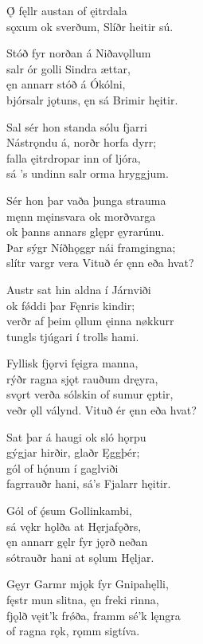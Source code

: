 \bva Ǫ́ fęllr austan \hld of ęitrdala \\
sǫxum ok sverðum, \hld Slíðr heitir sú.

\bva Stóð fyr norðan \hld á Niðavǫllum \\
salr ór golli \hld Sindra ættar, \\
ęn annarr stóð \hld á Ókólni, \\
bjórsalr jǫtuns, \hld ęn sá Brimir hęitir.

\bva Sal sér hon standa \hld sólu fjarri \\
Nástrǫndu á, \hld norðr horfa dyrr; \\
falla ęitrdropar \hld inn of ljóra, \\
sá ’s undinn salr \hld orma hryggjum.

\bva Sér hon þar vaða \hld þunga strauma \\
męnn męinsvara \hld ok morðvarga \\
ok þanns annars glępr \hld ęyrarúnu. \\
Þar sýgr Níðhǫggr \hld nái framgingna; \\
slítr vargr vera \hld Vituð ér ęnn eða hvat?

\bva Austr sat hin aldna \hld í Járnviði \\
ok fǿddi þar \hld Fęnris kindir; \\
verðr af þeim ǫllum \hld ęinna nøkkurr \\
tungls tjúgari \hld í trolls hami.

\bva Fyllisk fjǫrvi \hld fęigra manna, \\
rýðr ragna sjǫt \hld rauðum dręyra, \\
svǫrt verða sólskin \hld of sumur ęptir, \\
veðr ǫll válynd. \hld Vituð ér ęnn eða hvat?

\bva Sat þar á haugi \hld ok sló hǫrpu \\
gýgjar hirðir, \hld glaðr Ęggþér; \\
gól of hǫ́num \hld í gaglviði \\
fagrrauðr hani, \hld sá's Fjalarr hęitir.

\bva Gól of ǫ́sum \hld Gollinkambi, \\
sá vękr hǫlða \hld at Hęrjafǫðrs, \\
ęn annarr gęlr \hld fyr jǫrð neðan \\
sótrauðr hani \hld at sǫlum Hęljar.

\bva Gęyr Garmr mjǫk \hld fyr Gnipahęlli, \\
fęstr mun slitna, \hld ęn freki rinna, \\
fjǫlð vęit'k frǿða, \hld framm sé'k lęngra \\
of ragna rǫk, \hld rǫmm sigtíva.

